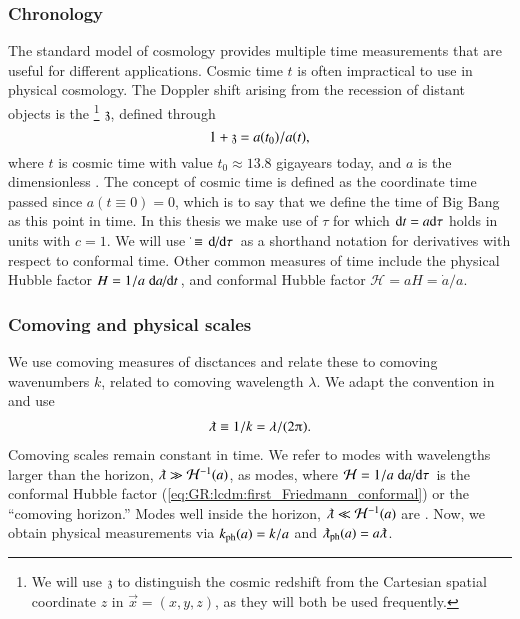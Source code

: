     \subsubsection{Chronology}
    The standard model of cosmology provides multiple time measurements that are useful for different applications. 
    Cosmic time $t$ is often impractical to use in physical cosmology. The Doppler shift arising from the recession of distant objects is the %
    \footnote{
        We will use $\mathfrak{z}$ to distinguish the cosmic redshift from the Cartesian spatial coordinate $z$ in $\vec{x}=(x,y,z)$, as they will both be used frequently.
    } %
    $\mathfrak{z}$, %
    defined through
    \begin{equation}
        1 + \mathfrak{z} = a(t_0)/a(t),
    \end{equation}
    where $t$ is cosmic time with value $t_0\approx 13.8$ gigayears today, and $a$ is the dimensionless . The concept of cosmic time is defined as the coordinate time passed since $a(t\equiv 0)=0$, 
    which is to say that we define the time of Big Bang as this point in time. 
    In this thesis we make use of  $\tau$ for which ${\diff t} = a {\diff \tau}$ holds %
    in units with $c=1$. We will use $\dot{}\equiv\dv*{}{\tau}$ as a shorthand notation for derivatives with respect to conformal time. %
    Other common measures of time include the physical Hubble factor $H=1/a \dv*{a}{t}$, and conformal Hubble factor $\mathcal{H}= aH = \dot{a}/a$.

    \subsubsection{Comoving and physical scales}
    We use comoving measures of disctances and relate these to comoving wavenumbers $k$, related to comoving wavelength $\lambda$. We adapt the convention in~\citet{maggioreGravitationalWavesVol2018} and use 
    \begin{align}
        \lambdabar \equiv   1/k  = \lambda/(2\ppi).
    \end{align}
    Comoving scales remain constant in time. We refer to modes with wavelengths larger than the horizon, $\lambdabar\gg \mathcal{H}^{-1}(a)$, as  modes, where $\mathcal{H}=1/a \dv*{a}{\tau}$ is the conformal Hubble factor (\cref{eq:GR:lcdm:first_Friedmann_conformal}) or the ``comoving horizon.'' %
    Modes well inside the horizon, $\lambdabar\ll \mathcal{H}^{-1}(a)$ are . %
    Now, we obtain physical measurements via $k_\mathrm{ph}(a) = k /a$ and $\lambdabar\ped{ph}(a) = a \lambdabar$.

